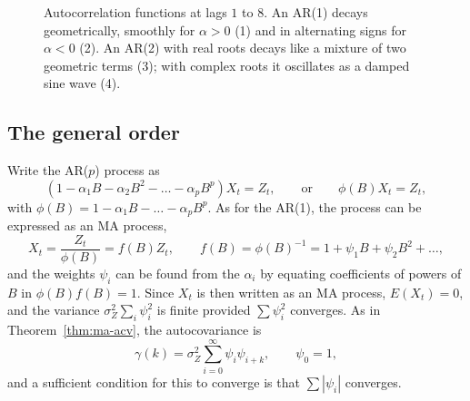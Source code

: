 \documentclass[11pt,a4paper]{article}
\theoremstyle{definition}
\begin{document}
\begin{figure}[H]
\centering
{}
\caption{Autocorrelation functions at lags $1$ to $8$. An AR(1) decays geometrically, smoothly for $\alpha > 0$ (1) and in
alternating signs for $\alpha < 0$ (2). An AR(2) with real roots decays like a mixture of two geometric terms (3); with
complex roots it oscillates as a damped sine wave (4).}
\label{fig:ar-acf}
\end{figure}

\subsection{The general order}
Write the AR($p$) process as
\[
(1 - \alpha_1B - \alpha_2B^2 - \dots - \alpha_pB^p)X_t = Z_t , \qquad\text{or}\qquad \phi(B)X_t = Z_t ,
\]
with $\phi(B) = 1 - \alpha_1B - \dots - \alpha_pB^p$. As for the AR(1), the process can be expressed as an MA process,
\[
X_t = \frac{Z_t}{\phi(B)} = f(B)Z_t , \qquad f(B) = \phi(B)^{-1} = 1 + \psi_1B + \psi_2B^2 + \dots ,
\]
and the weights $\psi_i$ can be found from the $\alpha_i$ by equating coefficients of powers of $B$ in $\phi(B)f(B) = 1$. Since $X_t$ is then written as
an MA process, $E(X_t) = 0$, and the variance $\sigma_Z^2\sum_i\psi_i^2$ is finite provided $\sum\psi_i^2$ converges. As in Theorem~\ref{thm:ma-acv}, the
autocovariance is
\[
\gamma(k) = \sigma_Z^2\sum_{i=0}^\infty\psi_i\psi_{i+k} , \qquad \psi_0 = 1 ,
\]
and a sufficient condition for this to converge is that $\sum|\psi_i|$ converges.
\end{document}
